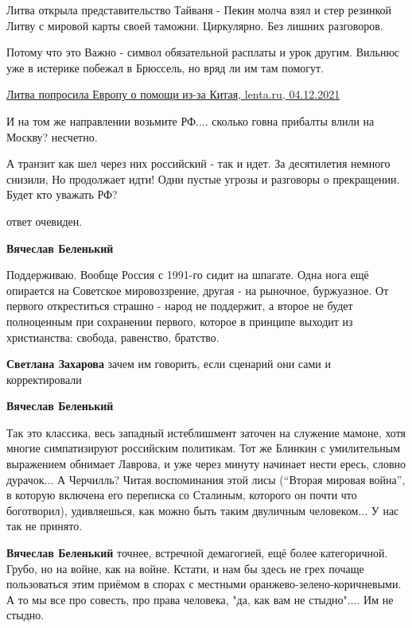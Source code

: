 \begin{itemize}
\begin{itemize}
Литва открыла представительство Тайваня - Пекин молча взял и стер резинкой
Литву с мировой карты своей таможни. Циркулярно. Без лишних разговоров.

Потому что это Важно - символ обязательной расплаты и урок другим.
Вильнюс уже в истерике побежал в Брюссель, но вряд ли им там помогут.

\href{https://lenta.ru/news/2021/12/04/litva/}{%
Литва попросила Европу о помощи из-за Китая, lenta.ru, 04.12.2021%
}

И на том же направлении возьмите РФ.... сколько говна прибалты влили на Москву?
несчетно.

А транзит как шел через них российский - так и идет. За десятилетия немного
снизили, Но продолжает идти! Одни пустые угрозы и разговоры о прекращении.
Будет кто уважать РФ?

ответ очевиден.

\textbf{Вячеслав Беленький} 

Поддерживаю. Вообще Россия с 1991-го сидит на шпагате. Одна нога ещё опирается
на Советское мировоззрение, другая - на рыночное, буржуазное. От первого
откреститься страшно - народ не поддержит, а второе не будет полноценным при
сохранении первого, которое в принципе выходит из христианства: свобода,
равенство, братство.


\textbf{Светлана Захарова} зачем им говорить, если сценарий они сами и корректировали

\textbf{Вячеслав Беленький} 

Так это классика, весь западный истеблишмент заточен на служение мамоне, хотя
многие симпатизируют российским политикам. Тот же Блинкин с умилительным
выражением обнимает Лаврова, и уже через минуту начинает нести ересь, словно
дурачок... А Черчилль? Читая воспоминания этой лисы (\enquote{Вторая мировая война}, в
которую включена его переписка со Сталиным, которого он почти что боготворил),
удивляешься, как можно быть таким двуличным человеком... У нас так не принято.

\textbf{Вячеслав Беленький} точнее, встречной демагогией, ещё более категоричной.
Грубо, но на войне, как на войне.
Кстати, и нам бы здесь не грех почаще пользоваться этим приёмом в спорах с местными оранжево-зелено-коричневыми.
А то мы все про совесть, про права человека, "да, как вам не стыдно"....
Им не стыдно.

\end{itemize} %


\end{itemize}
